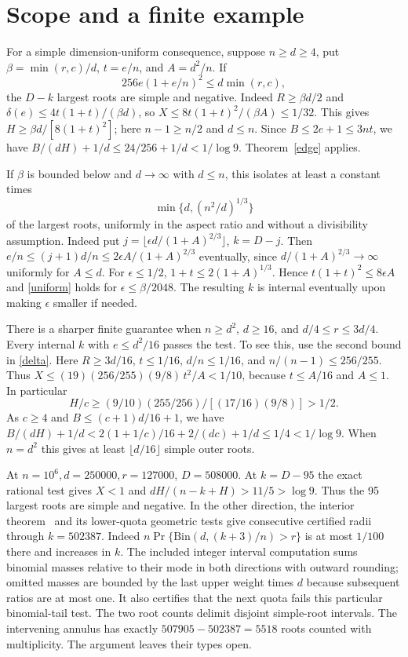 \documentclass[11pt]{article}
\begin{document}
\section{Scope and a finite example}
For a simple dimension-uniform consequence, suppose $n\ge d\ge4$, put $\beta=\min(r,c)/d$, $t=e/n$, and $A=d^2/n$. If
\begin{equation}\label{uniform}
 256e(1+e/n)^2\le d\min(r,c),
\end{equation}
the $D-k$ largest roots are simple and negative. Indeed $R\ge\beta d/2$ and $\delta(e)\le4t(1+t)/(\beta d)$, so $X\le8t(1+t)^2/(\beta A)\le1/32$. This gives $H\ge\beta d/[8(1+t)^2]$; here $n-1\ge n/2$ and $d\le n$. Since $B\le 2e+1\le3nt$, we have $B/(dH)+1/d\le24/256+1/d<1/\log9$. Theorem~\ref{edge} applies.

If $\beta$ is bounded below and $d\to\infty$ with $d\le n$, this isolates at least a constant times
\[
 \min\{d,(n^2/d)^{1/3}\}
\]
of the largest roots, uniformly in the aspect ratio and without a divisibility assumption. Indeed put $j=\lfloor\epsilon d/(1+A)^{2/3}\rfloor$, $k=D-j$. Then $e/n\le(j+1)d/n\le 2\epsilon A/(1+A)^{2/3}$ eventually, since $d/(1+A)^{2/3}\to\infty$ uniformly for $A\le d$. For $\epsilon\le1/2$, $1+t\le 2(1+A)^{1/3}$. Hence $t(1+t)^2\le8\epsilon A$ and \eqref{uniform} holds for $\epsilon\le\beta/2048$. The resulting $k$ is internal eventually upon making $\epsilon$ smaller if needed.

There is a sharper finite guarantee when $n\ge d^2$, $d\ge16$, and $d/4\le r\le3d/4$. Every internal $k$ with $e\le d^2/16$ passes the test. To see this, use the second bound in \eqref{delta}. Here $R\ge3d/16$, $t\le 1/16$, $d/n\le1/16$, and $n/(n-1)\le256/255$. Thus $X\le (19)(256/255)(9/8)\,t^2/A<1/10$, because $t\le A/16$ and $A\le1$. In particular
\[
 H/c\ge (9/10)(255/256)/[(17/16)(9/8)]>1/2 .
\]
As $c\ge4$ and $B\le(c+1)d/16+1$, we have $B/(dH)+1/d<2(1+1/c)/16+2/(dc)+1/d\le1/4<1/\log 9$. When $n=d^2$ this gives at least $\lfloor d/16\rfloor$ simple outer roots.

At $n=10^6,d=250000,r=127000$, $D=508000$. At $k=D-95$ the exact rational test gives $X<1$ and $dH/(n-k+H)>11/5>\log9$. Thus the 95 largest roots are simple and negative. In the other direction, the interior theorem~\cite{finite} and its lower-quota geometric tests give consecutive certified radii through $k=502387$. Indeed $n\Pr\{\mathrm{Bin}(d,(k+3)/n)>r\}$ is at most $1/100$ there and increases in $k$. The included integer interval computation sums binomial masses relative to their mode in both directions with outward rounding; omitted masses are bounded by the last upper weight times $d$ because subsequent ratios are at most one. It also certifies that the next quota fails this particular binomial-tail test. The two root counts delimit disjoint simple-root intervals. The intervening annulus has exactly $507905-502387=5518$ roots counted with multiplicity. The argument leaves their types open.
\end{document}
